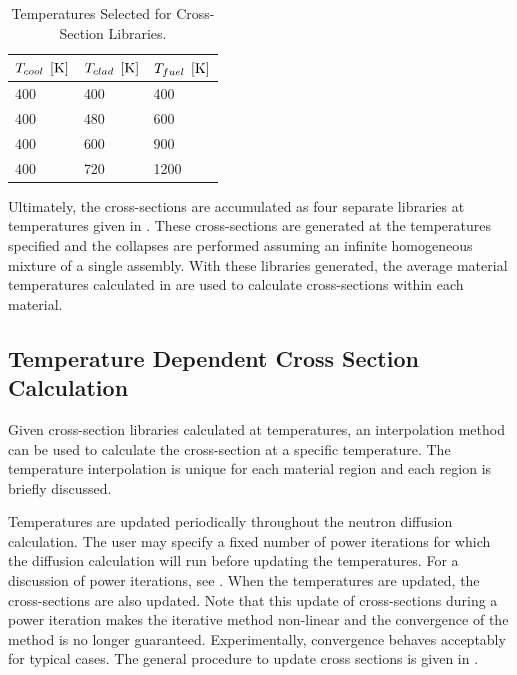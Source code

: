     \begin{table}
      \caption{Temperatures Selected for Cross-Section Libraries.}
      \label{tab:xstemps}
      \begin{center}
        \begin{tabular}{lll}
          \toprule
          $T_{cool} \;\left[\text{{K}}\right]$ & $T_{clad} \;\left[\text{{K}}\right]$ & $T_{fuel} \;\left[\text{{K}}\right]$ \\
          \midrule
          400 & 400 & 400  \\
          400 & 480 & 600  \\
          400 & 600 & 900  \\
          400 & 720 & 1200 \\
          \bottomrule
        \end{tabular}
      \end{center}
    \end{table}

    Ultimately, the cross-sections are accumulated as four separate libraries at
    temperatures given in . These cross-sections are generated
    at the temperatures specified and the collapses are performed assuming an
    infinite homogeneous mixture of a single assembly. With these libraries
    generated, the average material temperatures calculated in 
     are used to calculate cross-sections within each
    material.

  \subsection{Temperature Dependent Cross Section Calculation}
    Given cross-section libraries calculated at temperatures, an interpolation
    method can be used to calculate the cross-section at a specific temperature.
    The temperature interpolation is unique for each material region and each
    region is briefly discussed.

    Temperatures are updated periodically throughout the neutron diffusion
    calculation. The user may specify a fixed number of power iterations for
    which the diffusion calculation will run before updating the temperatures.
    For a discussion of power iterations, see . When
    the temperatures are updated, the cross-sections are also updated. Note that
    this update of cross-sections during a power iteration makes the iterative
    method non-linear and the convergence of the method is no longer guaranteed.
    Experimentally, convergence behaves acceptably for typical cases. The
    general procedure to update cross sections is given in
    .

